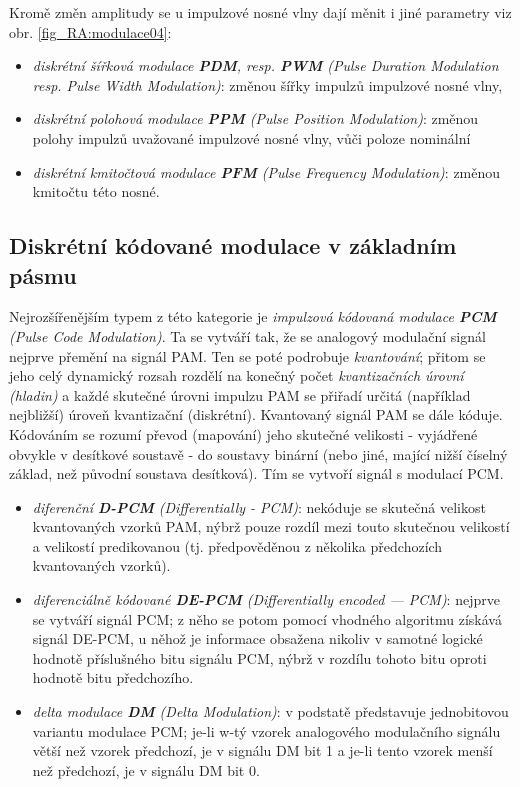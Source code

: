       Kromě změn amplitudy se u impulzové nosné vlny dají měnit i jiné parametry viz obr. 
      \ref{fig_RA:modulace04}:
      \begin{itemize}
        \item \emph{diskrétní šířková modulace \textbf{PDM}, resp. \textbf{PWM} (Pulse Duration Modulation 
              resp. Pulse Width Modulation)}: změnou šířky impulzů impulzové nosné vlny,
        \item \emph{diskrétní polohová modulace \textbf{PPM} (Pulse Position Modulation)}: změnou polohy 
        impulzů uvažované impulzové nosné vlny, vůči poloze nominální
        \item \emph{diskrétní kmitočtová modulace \textbf{PFM} (Pulse Frequency Modulation)}: změnou 
        kmitočtu této nosné.
      \end{itemize} 
    \subsection{Diskrétní kódované modulace v základním pásmu}
      Nejrozšířenějším typem z této kategorie je \emph{impulzová kódovaná modulace \textbf{PCM} (Pulse Code 
      Modulation)}. Ta se vytváří tak, že se analogový modulační signál nejprve přemění na signál PAM. Ten se 
      poté podrobuje \emph{kvantování}; přitom se jeho celý dynamický rozsah rozdělí na konečný počet 
      \emph{kvantizačních úrovní (hladin)} a každé skutečné úrovni impulzu PAM se přiřadí určitá (například 
      nejbližší) úroveň kvantizační (diskrétní). Kvantovaný signál PAM se dále kóduje. Kódováním se rozumí 
      převod (mapování) jeho skutečné velikosti - vyjádřené obvykle v desítkové soustavě - do soustavy 
      binární (nebo jiné, mající nižší číselný základ, než původní soustava desítková). Tím se vytvoří signál 
      s modulací PCM.
      \begin{itemize}
        \item \emph{diferenční \textbf{D-PCM} (Differentially - PCM)}: nekóduje se skutečná velikost 
              kvantovaných vzorků PAM, nýbrž pouze rozdíl mezi touto skutečnou velikostí a velikostí 
              predikovanou (tj. předpověděnou z několika předchozích kvantovaných vzorků).
        \item \emph{diferenciálně kódované \textbf{DE-PCM} (Differentially encoded — PCM)}: nejprve se 
              vytváří signál PCM; z něho se potom pomocí vhodného algoritmu získává signál DE-PCM, u něhož je 
              informace obsažena nikoliv v samotné logické hodnotě příslušného bitu signálu PCM, nýbrž v 
              rozdílu tohoto bitu oproti hodnotě bitu předchozího.
        \item \emph{delta modulace \textbf{DM} (Delta Modulation)}: v podstatě představuje jednobitovou 
              variantu modulace PCM; je-li w-tý vzorek analogového modulačního signálu větší než vzorek 
              předchozí, je v signálu DM bit 1 a je-li tento vzorek menší než předchozí, je v signálu DM bit 
              0.
      \end{itemize}
      
